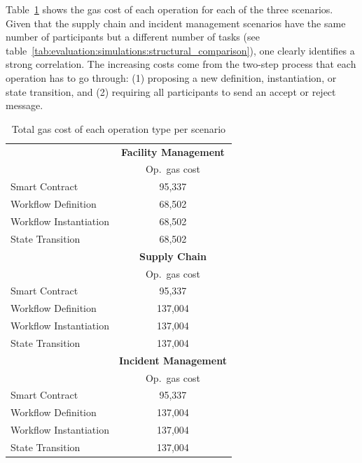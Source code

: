 Table~\ref{tab:evaluation:simulations:gas_cost} shows the gas cost of each operation for each of the three scenarios. Given that the supply chain and incident management scenarios have the same number of participants but a different number of tasks (see table~\ref{tab:evaluation:simulations:structural_comparison}), one clearly identifies a strong correlation. The increasing costs come from the two-step process that each operation has to go through: (1) proposing a new definition, instantiation, or state transition, and (2) requiring all participants to send an accept or reject message.

\begin{table}[h]
\centering
\begin{tabular}{|l|c|}
    \hline
    & \multicolumn{1}{c|}{\bfseries Facility Management} \\ \cline{2-2}
    & Op.\ gas cost \\
    \hline
    Smart Contract         & 95,337 \\
    Workflow Definition    & 68,502 \\
    Workflow Instantiation & 68,502 \\
    State Transition       & 68,502 \\
    \hline
    & \multicolumn{1}{c|}{\bfseries Supply Chain} \\ \cline{2-2}
    & Op.\ gas cost \\
    \hline
    Smart Contract         & 95,337  \\
    Workflow Definition    & 137,004 \\
    Workflow Instantiation & 137,004 \\
    State Transition       & 137,004 \\
    \hline
    & \multicolumn{1}{c|}{\bfseries Incident Management} \\ \cline{2-2}
    & Op.\ gas cost \\
    \hline
    Smart Contract         & 95,337  \\
    Workflow Definition    & 137,004 \\
    Workflow Instantiation & 137,004 \\
    State Transition       & 137,004 \\
    \hline
\end{tabular}
\caption{Total gas cost of each operation type per scenario}
\label{tab:evaluation:simulations:gas_cost}
\end{table}

